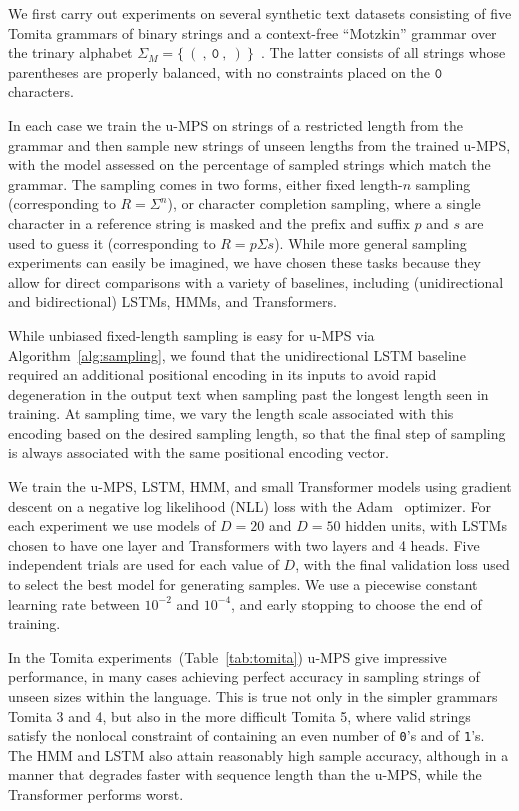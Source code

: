 \documentclass[twoside]{article}
\newcommand{\starchar}{0}
\begin{document}
We first carry out experiments on several synthetic text datasets consisting of five Tomita grammars of binary strings and a context-free ``Motzkin'' grammar over the trinary alphabet $\Sigma_{M} = \{\mathtt{\ (\ ,\ \starchar\ ,\ )\ }\}$~\citep{tomita1982, alexander2018}. The latter consists of all strings whose parentheses are properly balanced, with no constraints placed on the $\mathtt{\starchar}$ characters. 

In each case we train the u-MPS on strings of a restricted length from the grammar and then sample new strings of unseen lengths from the trained u-MPS, with the model assessed on the percentage of sampled strings which match the grammar. The sampling comes in two forms, either fixed length-$n$ sampling (corresponding to $R = \Sigma^n$), or character completion sampling, where a single character in a reference string is masked and the prefix and suffix $p$ and $s$ are used to guess it (corresponding to $R = p \Sigma s$). While more general sampling experiments can easily be imagined, we have chosen these tasks because they allow for direct comparisons with a variety of baselines, including (unidirectional and bidirectional) LSTMs, HMMs, and Transformers.

While unbiased fixed-length sampling is easy for u-MPS via Algorithm~\ref{alg:sampling}, we found that the unidirectional LSTM baseline required an additional positional encoding in its inputs to avoid rapid degeneration in the output text when sampling past the longest length seen in training. At sampling time, we vary the length scale associated with this encoding based on the desired sampling length, so that the final step of sampling is always associated with the same positional encoding vector.

We train the u-MPS, LSTM, HMM, and small Transformer models using gradient descent on a negative log likelihood (NLL) loss with the Adam~\citep{kingma2015} optimizer. For each experiment we use models of $D=20$ and $D=50$ hidden units, with LSTMs chosen to have one layer and Transformers with two layers and 4 heads. Five independent trials are used for each value of $D$, with the final validation loss used to select the best model for generating samples. We use a piecewise constant learning rate between $10^{-2}$ and $10^{-4}$, and early stopping to choose the end of training.

In the Tomita experiments~(Table~\ref{tab:tomita}) u-MPS give impressive performance, in many cases achieving perfect accuracy in sampling strings of unseen sizes within the language. This is true not only in the simpler grammars Tomita 3 and 4, but also in the more difficult Tomita 5, where valid strings satisfy the nonlocal constraint of containing an even number of \texttt{0}'s and of \texttt{1}'s. The HMM and LSTM also attain reasonably high sample accuracy, although in a manner that degrades faster with sequence length than the u-MPS, while the Transformer performs worst.
\end{document}

